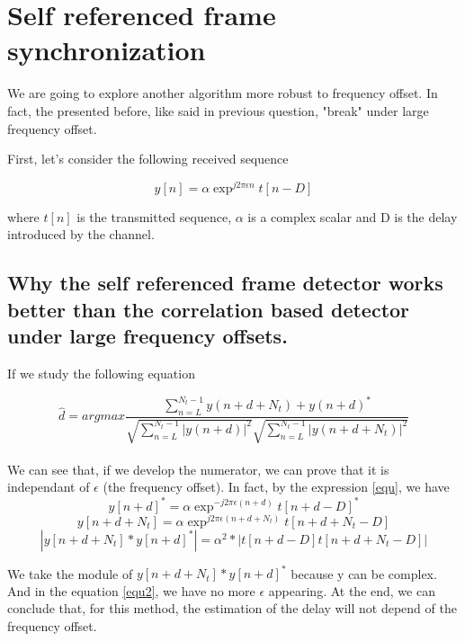 \documentclass[frenchb, oneside, headings=normal]{scrartcl}
\begin{document}
\section{Self referenced frame synchronization}

We are going to explore another algorithm more robust to frequency offset. In fact, the presented before, like said in previous question, "break" under large frequency offset.

First, let's consider the following received sequence

\begin{equation}
y[n] = 	\alpha \exp^{j2\pi \epsilon n}t[n-D]
\label{equ} 
\end{equation}

where $t[n]$ is the transmitted sequence, $\alpha$ is a complex scalar and D is the delay 	introduced by the channel.

\subsection{Why the self referenced frame detector works better than the correlation based detector under large frequency offsets.}

If we study the following equation

\begin{equation}
\hat{d}=argmax \frac{\sum_{n=L}^{N_t-1} y(n+d+N_t)+y(n+d)^*}{\sqrt{\sum_{n=L}^{N_t-1} |y(n+d)|^2}\sqrt{\sum_{n=L}^{N_t-1} |y(n+d+N_t)|^2}}
\end{equation}\\

We can see that, if we develop the numerator, we can prove that it is independant of $\epsilon$ (the frequency offset). In fact, by the expression \ref{equ}, we have\\

\begin{equation}
y[n+d]^*= \alpha \exp^{-j2\pi \epsilon (n+d)}t[n+d-D]^*
\end{equation}
\begin{equation}
y[n+d+N_t]= \alpha \exp^{j2\pi \epsilon (n+d+N_t)}t[n+d+N_t-D]
\end{equation}
\begin{equation}
|y[n+d+N_t]*y[n+d]^*| = \alpha^2*|t[n+d-D]t[n+d+N_t-D]|
\label{equ2}
\end{equation} 	

We take the module of $y[n+d+N_t]*y[n+d]^*$ because y can be complex. And in the equation \ref{equ2}, we have no more $\epsilon$ appearing.
At the end, we can conclude that, for this method, the estimation of the delay will not depend of the frequency offset. 
\end{document}
